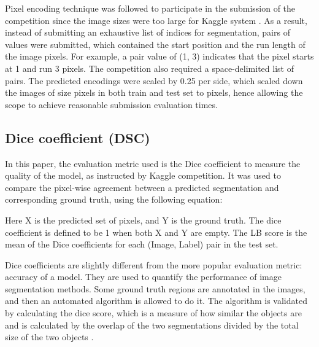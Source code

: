 \documentclass[conference]{IEEEtran}
\begin{document}
Pixel encoding technique was followed to participate in the submission of the competition since the image sizes were too large for Kaggle system  \cite{richards1993method}. As a result, instead of submitting an exhaustive list of indices for segmentation, pairs of values were submitted, which contained the start position and the run length of the image pixels. For example, a pair value of (1, 3) indicates that the pixel starts at 1 and run 3 pixels. The competition also required a space-delimited list of pairs. The predicted encodings were scaled by 0.25 per side, which scaled down the images of size  pixels in both train and test set to  pixels, hence allowing the scope to achieve reasonable submission evaluation times.






\subsection{Dice coefficient (DSC)}\label{dsc}

In this paper, the evaluation metric used is the Dice coefficient to measure the quality of the model, as instructed by Kaggle competition. It was used to compare the pixel-wise agreement between a predicted segmentation and corresponding ground truth, using the following equation:

\begin{center}

\end{center}

Here X is the predicted set of pixels, and Y is the ground truth. The dice coefficient is defined to be 1 when both X and Y are empty. The LB score is the mean of the Dice coefficients for each (Image, Label) pair in the test set.

Dice coefficients are slightly different from the more popular evaluation metric: accuracy of a model. They are used to quantify the performance of image segmentation methods. Some ground truth regions are annotated in the images, and then an automated algorithm is allowed to do it. The algorithm is validated by calculating the dice score, which is a measure of how similar the objects are and is calculated by the overlap of the two segmentations divided by the total size of the two objects \cite{dice1945measures}.
\end{document}

